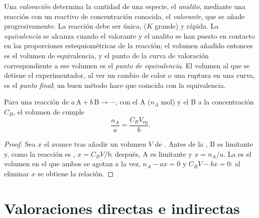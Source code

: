 \begin{definition}\label{def:b1:titration-methods:titration}
Una \emph{valoración} determina la cantidad de una
especie, el \emph{analito}, mediante una reacción con un
reactivo de concentración conocida, el \emph{valorante},
que se añade progresivamente. La reacción debe ser única, 
($K$ grande) y rápida. La \emph{equivalencia} se
alcanza cuando el valorante y el analito se han puesto en contacto en las
proporciones estequiométricas de la reacción; el volumen añadido entonces
es el volumen de equivalencia, y el punto de la curva de valoración
correspondiente a ese volumen es el \emph{punto de
equivalencia}. El volumen al que se detiene
el experimentador, al ver un cambio de color o una ruptura en una curva,
es el \emph{punto final}; un buen método hace que
coincida con la equivalencia.
\end{definition}

\begin{proposition}\label{prop:b1:titration-methods:equivalence}
Para una reacción de  $a\,\mathrm{A} + b\,\mathrm{B} \to \cdots$,
con el  A ($n_A$ mol) y el  B a la concentración $C_B$, el
volumen de  cumple
\[
  \frac{n_A}{a} = \frac{C_B V_{\mathrm{eq}}}{b} .
\]
\end{proposition}

\begin{proof}
Sea $x$ el avance tras añadir un volumen $V$ de . Antes de la
, B es limitante y, como la reacción es ,
$x = C_BV/b$; después, A es limitante y $x = n_A/a$. La  es el
volumen en el que ambos se agotan a la vez, $n_A - ax = 0$ y
$C_BV - bx = 0$: al eliminar $x$ se obtiene la relación.
\end{proof}

\section{Valoraciones directas e indirectas}

